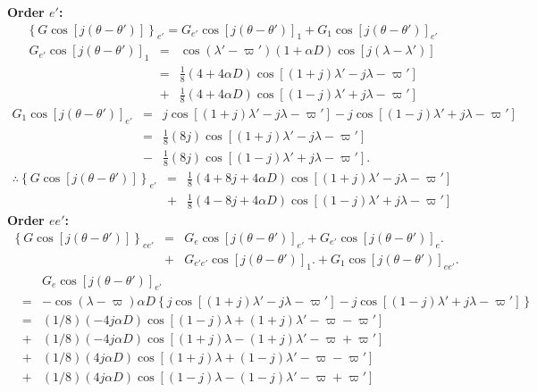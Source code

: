 \documentclass [12pt, a4paper] {article}
\begin{document}
\textbf{Order $e'$:}
\begin {eqnarray}
    \left\{G\cos[j(\theta - \theta')]\right\}_{e'}
    =
    G_{e'}\cos[j(\theta - \theta')]_1
    +
    G_{1}\cos[j(\theta - \theta')]_{e'}
\end {eqnarray}
\begin {eqnarray}
     G_{e'}\cos[j(\theta - \theta')]_1
     &=&
    \cos(\lambda' - \varpi')(1 + \alpha D)\cos[j(\lambda - \lambda')]
    \\
    &=&
    \frac{1}{8}
    \left(
        4 + 4\alpha D
    \right)
    \cos[(1 + j)\lambda' - j\lambda - \varpi']
    \\\nonumber 
    &+&
    \frac{1}{8}
    \left(
        4 + 4\alpha D
    \right)
    \cos[(1 - j)\lambda' + j\lambda - \varpi']
\end {eqnarray}
\begin {eqnarray}
    G_{1}\cos[j(\theta - \theta')]_{e'}
    &=&
    j\cos[(1 + j)\lambda' - j\lambda - \varpi']
    - 
    j\cos[(1 - j)\lambda' + j\lambda - \varpi']
    \\
    &=& 
    \frac{1}{8}\left(8j\right)\cos[(1 + j)\lambda' - j\lambda - \varpi']
    \\\nonumber
    &-& 
    \frac{1}{8}\left(8j\right)\cos[(1 - j)\lambda' + j\lambda - \varpi'].
\end {eqnarray}
\begin {eqnarray}
    \therefore 
    \left\{G\cos[j(\theta - \theta')]\right\}_{e'}
    &=&
    \frac{1}{8}
    \left(
        4 + 8j + 4\alpha D
    \right)
    \cos[(1 + j)\lambda' - j\lambda - \varpi']
    \\\nonumber 
    &+&
    \frac{1}{8}
    \left(
        4 - 8j + 4\alpha D
    \right)
    \cos[(1 - j)\lambda' + j\lambda - \varpi']
\end {eqnarray}
\newpage 
\textbf{Order $ee'$:}
\begin {eqnarray}
    \left\{G\cos[j(\theta - \theta')]\right\}_{ee'} 
    &=&
    G_{e}\cos[j(\theta - \theta')]_{e'}
    +
    G_{e'}\cos[j(\theta - \theta')]_{e}.
    \\\nonumber
    &+&
    G_{e'e'}\cos[j(\theta - \theta')]_{1}.
    +
    G_{1}\cos[j(\theta - \theta')]_{ee'}.
\end {eqnarray}
\begin {eqnarray}
    &\:&
    G_{e}\cos[j(\theta - \theta')]_{e'}
    \\\nonumber
    &=&
    - \cos(\lambda - \varpi)\alpha D
    \left\{
        j\cos[(1 + j)\lambda' - j\lambda - \varpi']
        - 
        j\cos[(1 - j)\lambda' + j\lambda - \varpi']
    \right\}
    \\
    &=& 
    (1/8)\left(-4j\alpha D\right)\cos[(1-j)\lambda + (1 + j)\lambda' - \varpi - \varpi']
    \\\nonumber 
    &+&
    (1/8)\left(-4j\alpha D\right)\cos[(1+j)\lambda - (1 + j)\lambda' - \varpi + \varpi']
    \\\nonumber 
    &+&
    (1/8)\left(4j\alpha D\right)\cos[(1+j)\lambda + (1 - j)\lambda' - \varpi - \varpi']
    \\\nonumber 
    &+&
    (1/8)\left(4j\alpha D\right)\cos[(1-j)\lambda - (1 - j)\lambda' - \varpi + \varpi']
\end {eqnarray}
\end{document}
